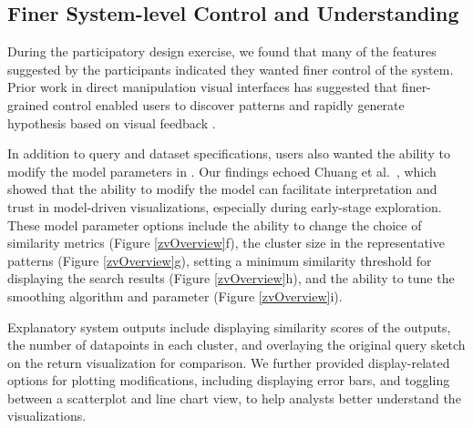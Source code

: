 \subsection{Finer System-level Control and  Understanding}
\par During the participatory design exercise, we found that many of the features suggested by the participants indicated they wanted finer control of the system. Prior work in direct manipulation visual interfaces has suggested that finer-grained control enabled users to discover patterns and rapidly generate hypothesis based on visual feedback \cite{Shneiderman1994,Shneiderman2007a}. 
\par \textbf{}
In addition to query and dataset specifications, users also wanted the ability to modify the model parameters in \zv. Our findings echoed Chuang et al.~\cite{Chuang2012}, which showed that the ability to modify the model can facilitate interpretation and trust in model-driven visualizations, especially during early-stage exploration. These model parameter options include the ability to change the choice of similarity metrics (Figure \ref{zvOverview}f), the cluster size in the representative patterns (Figure \ref{zvOverview}g), setting a minimum similarity threshold for displaying the search results (Figure \ref{zvOverview}h), and the ability to tune the smoothing algorithm and parameter (Figure \ref{zvOverview}i).
\par \textbf{} 
Explanatory system outputs include displaying similarity scores of the outputs, the number of datapoints in each cluster, and overlaying the original query sketch on the return visualization for comparison. We further provided display-related options for plotting modifications, including displaying error bars, and toggling between a scatterplot and line chart view, to help analysts better understand the visualizations.
